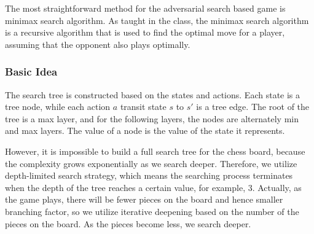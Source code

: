 The most straightforward method for the adversarial search based game is minimax search algorithm.
As taught in the class, the minimax search algorithm is a recursive algorithm that is used to find the optimal move for a player, assuming that the opponent also plays optimally.
\subsubsection*{Basic Idea}
The search tree is constructed based on the states and actions.
Each state is a tree node, while each action $a$ transit state $s$ to $s'$ is a tree edge.
The root of the tree is a max layer, and for the following layers, the nodes are alternately min and max layers.
The value of a node is the value of the state it represents.

However, it is impossible to build a full search tree for the chess board, because the complexity grows exponentially as we search deeper.
Therefore, we utilize depth-limited search strategy, which means the searching process terminates when the depth of the tree reaches a certain value, for example, 3.
Actually, as the game plays, there will be fewer pieces on the board and hence smaller branching factor, so we utilize iterative deepening based on the number of the pieces on the board.
As the pieces become less, we search deeper.

